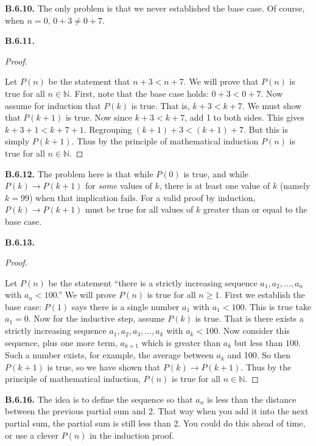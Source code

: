 \documentclass[10pt,]{book}
\theoremstyle{plain}
\theoremstyle{definition}
\theoremstyle{definition}
\theoremstyle{definition}
\theoremstyle{definition}
\numberwithin{equation}{chapter}
\def\N{\mathbb N}
\def\imp{\rightarrow}
\newcommand{\lt}{<}
\begin{document}
\par\smallskip
\noindent\textbf{B.6.10.} \hypertarget{p-2301}{}%
The only problem is that we never established the base case. Of course, when \(n = 0\), \(0+3 \ne 0+7\).%
\par\smallskip
\noindent\textbf{B.6.11.} \begin{proof}\hypertarget{proof-50}{}
\hypertarget{p-2303}{}%
Let \(P(n)\) be the statement that \(n + 3 \lt  n + 7\). We will prove that \(P(n)\) is true for all \(n \in \N\). First, note that the base case holds: \(0+3 \lt  0+7\). Now assume for induction that \(P(k)\) is true. That is, \(k+3 \lt  k+7\). We must show that \(P(k+1)\) is true. Now since \(k + 3 \lt  k + 7\), add 1 to both sides. This gives \(k + 3 + 1 \lt  k + 7 + 1\). Regrouping \((k+1) + 3 \lt  (k+1) + 7\). But this is simply \(P(k+1)\). Thus by the principle of mathematical induction \(P(n)\) is true for all \(n \in \N\).%
\end{proof}
\par\smallskip
\noindent\textbf{B.6.12.} \hypertarget{p-2306}{}%
The problem here is that while \(P(0)\) is true, and while \(P(k) \imp P(k+1)\) for \emph{some} values of \(k\), there is at least one value of \(k\) (namely \(k = 99\)) when that implication fails. For a valid proof by induction, \(P(k) \imp P(k+1)\) must be true for all values of \(k\) greater than or equal to the base case.%
\par\smallskip
\noindent\textbf{B.6.13.} \begin{proof}\hypertarget{proof-52}{}
\hypertarget{p-2308}{}%
Let \(P(n)\) be the statement ``there is a strictly increasing sequence \(a_1, a_2, \ldots, a_n\) with \(a_n \lt  100\).'' We will prove \(P(n)\) is true for all \(n \ge 1\). First we establish the base case: \(P(1)\) says there is a single number \(a_1\) with \(a_1 \lt  100\). This is true \textendash{} take \(a_1 = 0\). Now for the inductive step, assume \(P(k)\) is true. That is there exists a strictly increasing sequence \(a_1, a_2, a_3, \ldots, a_k\) with \(a_k \lt  100\). Now consider this sequence, plus one more term, \(a_{k+1}\) which is greater than \(a_k\) but less than \(100\). Such a number exists, for example, the average between \(a_k\) and 100. So then \(P(k+1)\) is true, so we have shown that \(P(k) \imp P(k+1)\). Thus by the principle of mathematical induction, \(P(n)\) is true for all \(n \in \N\).%
\end{proof}
\par\smallskip
\noindent\textbf{B.6.16.} \hypertarget{p-2313}{}%
The idea is to define the sequence so that \(a_n\) is less than the distance between the previous partial sum and 2. That way when you add it into the next partial sum, the partial sum is still less than 2. You could do this ahead of time, or use a clever \(P(n)\) in the induction proof.%
\end{document}
